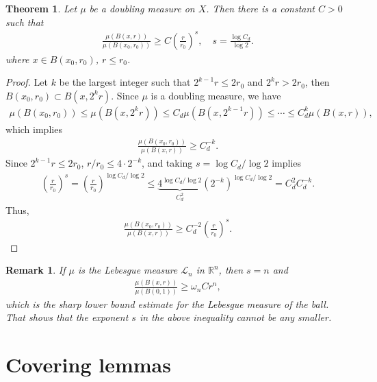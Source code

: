 \documentclass[11pt]{book}
\newtheorem{theorem}{Theorem}[chapter]
\newtheorem{remark}{Remark}[chapter]
\theoremstyle{definition}
\numberwithin{equation}{chapter}
\def\L{{\mathcal L}}
\begin{document}
\begin{theorem}\label{theorem_53}
Let $\mu$ be a doubling measure on $X$. Then there is a constant $C > 0$ such that
\begin{align}\label{theorem_53_equ1}
    \frac{\mu(B(x,r))}{\mu(B(x_0,r_0))} \geq C \left(\frac{r}{r_0}\right)^s, \quad s = \frac{\log C_d}{\log 2}.
\end{align}
where $x \in B(x_0,r_0)$, $r \leq r_0$.
\end{theorem}
\begin{proof}
Let $k$ be the largest integer such that $2^{k-1}r \leq 2r_0$ and $2^kr > 2r_0$, then $B(x_0,r_0) \subset B(x,2^kr)$. Since $\mu$ is a doubling measure, we have
\begin{align*}
    \mu(B(x_0,r_0)) \leq \mu \left(B\left(x,2^kr\right)\right) \leq C_d \mu \left(B\left(x,2^{k-1}r\right)\right) \leq \cdots \leq C_d^k \mu(B(x,r)),
\end{align*}
which implies
\begin{align*}
    \frac{\mu(B(x_0,r_0))}{\mu(B(x,r))} \geq C_d^{-k}.
\end{align*}
Since $2^{k-1}r \leq 2r_0$, $r/r_0 \leq 4 \cdot 2^{-k}$, and taking $s = \log C_d/\log 2$ implies
\begin{align*}
    \left(\frac{r}{r_0}\right)^s = \left(\frac{r}{r_0}\right)^{\log C_d/\log 2} \leq \underbrace{4^{\log C_d/\log 2}}_{C_d^2} \left(2^{-k}\right)^{\log C_d/\log 2} = C_d^2 C_d^{-k}.
\end{align*}
Thus,
\begin{align*}
    \frac{\mu(B(x_0,r_0))}{\mu(B(x,r))} \geq C_d^{-2} \left(\frac{r}{r_0}\right)^s.
\end{align*}
\end{proof}

\medskip

\begin{remark}
If $\mu$ is the Lebesgue measure $\L_n$ in $\mathbb{R}^n$, then $s = n$ and 
\begin{align*}
    \frac{\mu(B(x,r))}{\mu(B(0,1))} \geq \omega_n C r^n,
\end{align*}
which is the sharp lower bound estimate for the Lebesgue measure of the ball. That shows that the exponent $s$ in the above inequality cannot be any smaller.
\end{remark}

\medskip

\section{Covering lemmas}
\end{document}
